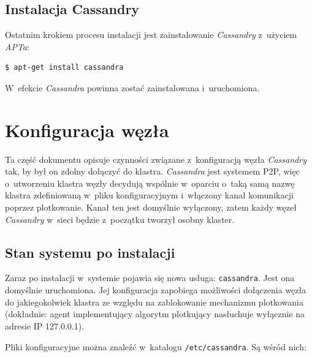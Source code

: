 \documentclass{article} %
\begin{document}
\subsection{Instalacja Cassandry}\label{subsec:install_install}

Ostatnim krokiem procesu instalacji jest zainstalowanie \emph{Cassandry} z~użyciem \emph{APTa}:
\begin{lstlisting}[style=bash, caption={instalacja \emph{Cassandry}}]
$ apt-get install cassandra
\end{lstlisting}

W~efekcie \emph{Cassandra} powinna zostać zainstalowana i~uruchomiona.

\section{Konfiguracja węzła}\label{sec:config}

Ta część dokumentu opisuje czynności związane z~konfiguracją węzła \emph{Cassandry} tak, by był on zdolny dołączyć do klastra.
\emph{Cassandra} jest systemem P2P, więc o~utworzeniu klastra węzły decydują wspólnie w~oparciu o~taką samą nazwę klastra zdefiniowaną w~pliku konfiguracyjnym i~włączony kanał komunikacji poprzez plotkowanie.
Kanał ten jest domyślnie wyłączony, zatem każdy węzeł \emph{Cassandry} w~sieci będzie z~początku tworzył osobny klaster.

\subsection{Stan systemu po instalacji}\label{subsec:config_postinst}

Zaraz po instalacji w~systemie pojawia się nowa usługa: \texttt{cassandra}.
Jest ona domyślnie uruchomiona.
Jej konfiguracja zapobiega możliwości dołączenia węzła do jakiegokolwiek klastra ze względu na zablokowanie mechanizmu plotkowania (dokładnie: agent implementujący algorytm plotkujący nasłuchuje wyłącznie na adresie IP 127.0.0.1).

Pliki konfiguracyjne można znaleźć w~katalogu \texttt{/etc/cassandra}.
Są wśród nich:
\end{document}
